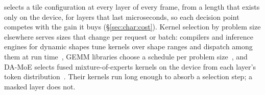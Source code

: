 \sysname selects a tile configuration at every layer of every frame, from a
length that exists only on the device, for layers that last microseconds, so
each decision point competes with the gain it buys (\S\ref{sec:char:cost}).
Kernel selection by problem size elsewhere serves sizes that change per
request or batch: compilers and inference engines for dynamic shapes tune
kernels over shape ranges and dispatch among them at run
time~\cite{dietcode,nimble,tensorrt}, GEMM libraries choose a schedule per
problem size~\cite{streamkpp}, and DA-MoE selects fused mixture-of-experts
kernels on the device from each layer's token distribution~\cite{damoe}. Their
kernels run long enough to absorb a selection step; a masked layer does not.


